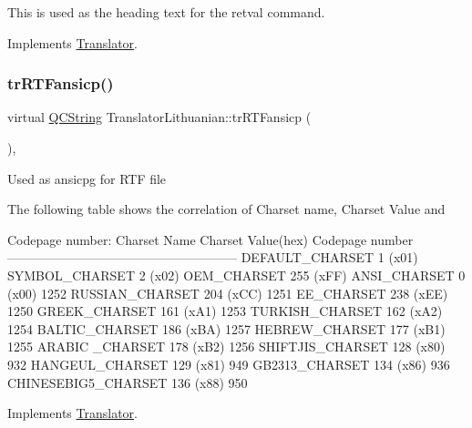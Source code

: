 This is used as the heading text for the retval command. 

Implements \mbox{\hyperlink{class_translator}{Translator}}.

\mbox{\label{class_translator_lithuanian_ae7d46ca0a4660dab81d90d01a2cdef6f}} 
\subsubsection{\texorpdfstring{trRTFansicp()}{trRTFansicp()}}
{\footnotesize\ttfamily virtual \mbox{\hyperlink{class_q_c_string}{Q\+C\+String}} Translator\+Lithuanian\+::tr\+R\+T\+Fansicp (\begin{DoxyParamCaption}{ }\end{DoxyParamCaption})\hspace{0.3cm}{\ttfamily [inline]}, {\ttfamily [virtual]}}

Used as ansicpg for R\+TF file

The following table shows the correlation of Charset name, Charset Value and 
\begin{DoxyPre}
Codepage number:
Charset Name       Charset Value(hex)  Codepage number
------------------------------------------------------
DEFAULT\_CHARSET           1 (x01)
SYMBOL\_CHARSET            2 (x02)
OEM\_CHARSET             255 (xFF)
ANSI\_CHARSET              0 (x00)            1252
RUSSIAN\_CHARSET         204 (xCC)            1251
EE\_CHARSET              238 (xEE)            1250
GREEK\_CHARSET           161 (xA1)            1253
TURKISH\_CHARSET         162 (xA2)            1254
BALTIC\_CHARSET          186 (xBA)            1257
HEBREW\_CHARSET          177 (xB1)            1255
ARABIC \_CHARSET         178 (xB2)            1256
SHIFTJIS\_CHARSET        128 (x80)             932
HANGEUL\_CHARSET         129 (x81)             949
GB2313\_CHARSET          134 (x86)             936
CHINESEBIG5\_CHARSET     136 (x88)             950
\end{DoxyPre}
 

Implements \mbox{\hyperlink{class_translator_a9953a4c0e6a4fc7d017abcd5c2939e0f}{Translator}}.

\mbox{\label{class_translator_lithuanian_a2a6e94025b2d478ca9e09f2867a9bff2}} 
